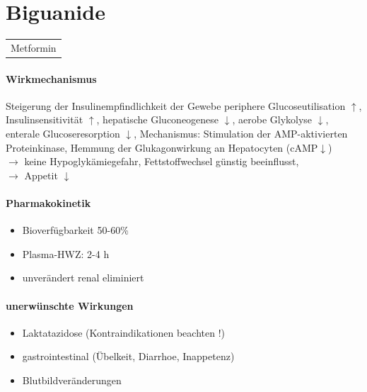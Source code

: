 \documentclass[10pt,a4paper]{report}
\begin{document}
\section{Biguanide} %
\label{sec:biguanide}
\begin{tabularx}{\textwidth}{X}
Metformin\\
\end{tabularx}
\paragraph{Wirkmechanismus} %
\label{subp:wirkmechanismus}
Steigerung der Insulinempfindlichkeit der Gewebe
periphere Glucoseutilisation $\uparrow$, Insulinsensitivität $\uparrow$, hepatische Gluconeogenese $\downarrow$, aerobe Glykolyse $\downarrow$, enterale Glucoseresorption $\downarrow$, 
Mechanismus: Stimulation der AMP-aktivierten Proteinkinase, Hemmung der Glukagonwirkung  an Hepatocyten (cAMP$\downarrow$)\\
$\rightarrow$ keine Hypoglykämiegefahr, Fettstoffwechsel günstig beeinflusst, \\
$\rightarrow$ Appetit $\downarrow$
\paragraph{Pharmakokinetik} %
\label{subp:pharmakokinetik}
\begin{itemize}
	\item Bioverfügbarkeit 50-60\%
	\item Plasma-HWZ: 2-4 h
	\item unverändert renal eliminiert
\end{itemize}
\paragraph{unerwünschte Wirkungen} %
\label{subp:uner}
\begin{itemize}
	\item Laktatazidose (Kontraindikationen beachten !)
	\item gastrointestinal (Übelkeit, Diarrhoe, Inappetenz)
	\item Blutbildveränderungen
\end{itemize}
\end{document}
